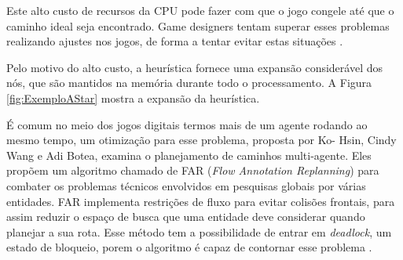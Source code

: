 Este alto custo de recursos da CPU pode fazer com que o jogo congele até que o caminho ideal seja encontrado. Game designers tentam superar esses problemas realizando ajustes nos jogos, de forma a tentar evitar estas situações \cite{Timothy}.

Pelo motivo do alto custo, a heurística fornece uma expansão considerável dos nós, que são mantidos na memória durante todo o processamento. A Figura \ref{fig:ExemploAStar} mostra a expansão da heurística.

\begin{minipage}{\linewidth}
    \label{fig:ExemploAStar}
\end{minipage}

É comum no meio dos jogos digitais termos mais de um agente rodando ao mesmo tempo, um otimização para esse problema, proposta por Ko- Hsin, Cindy Wang e Adi Botea, examina o planejamento de caminhos multi-agente. Eles propõem um algoritmo chamado de FAR (\textit{Flow Annotation Replanning}) para combater os problemas técnicos envolvidos em pesquisas globais por várias entidades.
FAR implementa restrições de fluxo para evitar colisões frontais, para assim reduzir o espaço de busca que uma entidade deve considerar quando planejar a sua rota. Esse método tem a possibilidade de entrar em \textit{deadlock}, um estado de bloqueio, porem o algoritmo é capaz de contornar esse problema \cite{Ko-hsin}.

